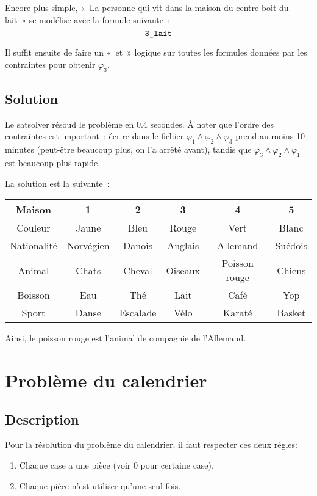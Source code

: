 Encore plus simple, «~La personne qui vit dans la maison du centre boit du
lait~» se modélise avec la formule suivante~:
\begin{equation*}
    \verb|3_lait|
\end{equation*}

Il suffit ensuite de faire un «~et~» logique sur toutes les formules données
par les contraintes pour obtenir $\varphi_3$.

\subsection{Solution}
Le satsolver résoud le problème en 0.4 secondes. À noter que l’ordre des
contraintes est important~: écrire dans le fichier
$\varphi_1 \wedge \varphi_2 \wedge \varphi_3$ prend au moins 10 minutes
(peut-être beaucoup plus, on l’a arrêté avant), tandis que
$\varphi_3 \wedge \varphi_2 \wedge \varphi_1$ est beaucoup plus rapide.

La solution est la suivante~:
\begin{tabular}{|c|c|c|c|c|c|}
    \hline
    Maison      & 1         & 2         & 3       & 4             & 5 \\
    \hline
    Couleur     & Jaune     & Bleu      & Rouge   & Vert          & Blanc \\
    \hline
    Nationalité & Norvégien & Danois    & Anglais & Allemand      & Suédois \\
    \hline
    Animal      & Chats     & Cheval    & Oiseaux & Poisson rouge & Chiens \\
    \hline
    Boisson     & Eau       & Thé       & Lait    & Café          & Yop \\
    \hline
    Sport       & Danse     & Escalade  & Vélo    & Karaté        & Basket \\
    \hline
\end{tabular}

Ainsi, le poisson rouge est l’animal de compagnie de l’Allemand.


    \section{Problème du calendrier}
    \subsection*{Description}
    Pour la résolution du problème du calendrier, il faut respecter ces deux règles:
    \begin{enumerate}
        \item Chaque case a une pièce (voir 0 pour certaine case).
        \item Chaque pièce n'est utiliser qu'une seul fois.
    \end{enumerate}
    
